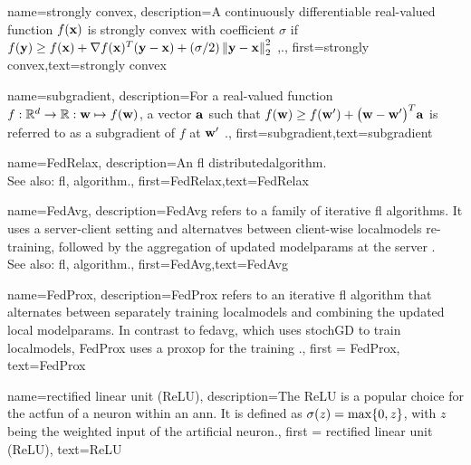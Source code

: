 {name={strongly convex},
	description={A continuously \gls{differentiable} real-valued 
		function $f({\bf x})$ is strongly \gls{convex} with coefficient $\sigma$ if $f({\bf y}) \geq f({\bf x}) + \nabla f({\bf x})^{T} ({\bf y} - {\bf x}) + (\sigma/2) \left\Vert {{\bf y}- {\bf x}} \right\Vert_{2}^{2}$ \cite{nesterov04},\cite[Sec. B.1.1]{CvxAlgBertsekas}.},
	first={strongly convex},text={strongly convex} 
}

{name={subgradient},
description={For a real-valued function $f: \mathbb{R}^{d} \rightarrow \mathbb{R}: {\bf w} \mapsto f({\bf w})$, 
		a vector ${\bf a}$ such that $f({\bf w}) \geq  f({\bf w}') +\big({\bf w}-{\bf w}' \big)^{T} {\bf a}$ is 
		referred to as a subgradient of $f$ at ${\bf w}'$ \cite{BertCvxAnalOpt,BertsekasNonLinProgr}.},
	first={subgradient},text={subgradient} 
}

{name={FedRelax},
	description={An \gls{fl} \gls{distributedalgorithm}. 
		\\ 
		See also: \gls{fl}, \gls{algorithm}.},
	first={FedRelax},text={FedRelax}
} 

{name={FedAvg},
	description={FedAvg refers to a family of iterative \gls{fl} \glspl{algorithm}. 
		It uses a server-client setting and alternatves between client-wise \glspl{localmodel} 
		re-training, followed by the aggregation of updated \gls{modelparams} at the server 
		\cite{pmlr-v54-mcmahan17a}.  
		\\ 
		See also: \gls{fl}, \gls{algorithm}.},
	first={FedAvg},text={FedAvg}
} 

{name={FedProx},
	description={FedProx refers to an iterative \gls{fl} \gls{algorithm} that alternates between separately training \gls{localmodel}s and combining the updated local \gls{modelparams}. In contrast to \gls{fedavg}, which uses 
		\gls{stochGD} to train \gls{localmodel}s, FedProx uses a \gls{proxop} for the training \cite{FedProx2020}.}, 
	first = {FedProx}, text={FedProx} 
}

{name={rectified linear unit (ReLU)},
	description={The ReLU is 
		a popular choice for the \gls{actfun} of a neuron within an \gls{ann}. It is defined 
		as $\sigma(z) = \max\{0,z\}$, with $z$ being the weighted input of the artificial 
		neuron.}, first = {rectified linear unit (ReLU)}, text={ReLU} 
}



